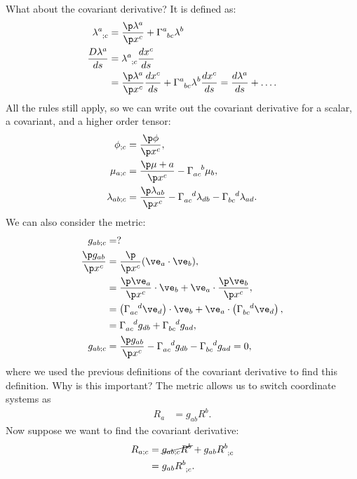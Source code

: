 \documentclass[a4paper, 11pt, normalem]{report}
\begin{document}
What about the covariant derivative?
It is defined as:
\begin{align}
    \tensor{\lambda}{^a_{;c}} &= \frac{\p\lambda^a}{\p x^c} + \tensor{\Gamma}{^a_{bc}}\lambda^b \\
    \frac{D\lambda^a}{ds} &= \tensor{\lambda}{^a_{;c}}\frac{dx^c}{ds} \\
                          &= \frac{\p\lambda^a}{\p x^c}\frac{dx^c}{ds} + \tensor{\Gamma}{^a_{bc}}\lambda^b\frac{dx^c}{ds} = \frac{d\lambda^a}{ds} + \dots.
\end{align}
All the rules still apply, so we can write out the covariant derivative for a scalar, a covariant, and a higher order tensor:
\begin{align}
    \phi_{;c} &= \frac{\p\phi}{\p x^c}, \\
    \mu_{a;c} &= \frac{\p\mu+a}{\p x^c}-\tensor{\Gamma}{_{ac}^b}\mu_b, \\
    \lambda_{ab;c} &= \frac{\p\lambda_{ab}}{\p x^c} - \tensor{\Gamma}{_{ac}^d}\lambda_{db}-\tensor{\Gamma}{_{bc}^d}\lambda_{ad}.
\end{align}
We can also consider the metric:
\begin{align}
    g_{ab;c} &= ? \\
    \frac{\p g_{ab}}{\p x^c} &= \frac{\p}{\p x^c} (\ve_a\cdot\ve_b), \\
                             &= \frac{\p\ve_a}{\p x^c}\cdot\ve_b + \ve_a\cdot\frac{\p\ve_b}{\p x^c},\\
                             &= \left(\tensor{\Gamma}{_{ac}^d}\ve_d\right)\cdot\ve_b + \ve_a\cdot\left(\tensor{\Gamma}{_{bc}^d}\ve_d\right), \\
                             &= \tensor{\Gamma}{_{ac}^d}g_{db} + \tensor{\Gamma}{_{bc}^d}g_{ad}, \\
    g_{ab;c} &= \frac{\p g_{ab}}{\p x^c} - \tensor{\Gamma}{_{ac}^d}g_{db} - \tensor{\Gamma}{_{bc}^d}g_{ad} = 0,
\end{align}
where we used the previous definitions of the covariant derivative to find this definition.
Why is this important?
The metric allows us to switch coordinate systems as
\begin{align}
    R_a &= g_{ab}R^b.
\end{align}
Now suppose we want to find the covariant derivative:
\begin{align}
    R_{a;c} &= \cancel{g_{ab;c}R^b} + g_{ab}\tensor{R}{^b_{;c}} \\
            &= g_{ab}\tensor{R}{^b_{;c}}.
\end{align}
\end{document}
